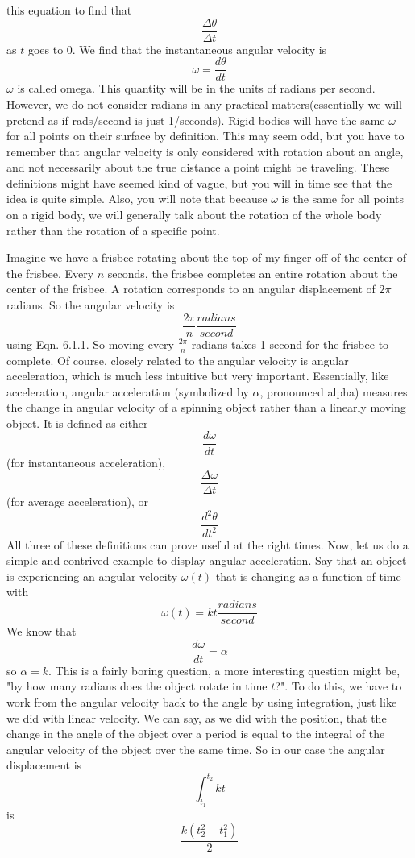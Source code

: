 \documentclass{article}[gray]
\numberwithin{equation}{subsection}
\begin{document}
this equation to find that $$\frac{\Delta \theta}{\Delta t}$$ as $t$ goes to 0. We find that the instantaneous angular velocity is \begin{equation}\omega=\frac{d\theta}{dt}\end{equation} $\omega$ is called omega. This quantity will be in the units of radians per second. However, we do not consider radians in any practical matters(essentially we will pretend as if rads/second is just 1/seconds). Rigid bodies will have the same $\omega$ for all points on their surface by definition. This may seem odd, but you have to remember that angular velocity is only considered with rotation about an angle, and not necessarily about the true distance a point might be traveling. These definitions might have seemed kind of vague, but you will in time see that the idea is quite simple. Also, you will note that because $\omega$ is the same for all points on a rigid body, we will generally talk about the rotation of the whole body rather than the rotation of a specific point. 

Imagine we have a frisbee rotating about the top of my finger off of the center of the frisbee. Every $n$ seconds, the frisbee completes an entire rotation about the center of the frisbee. A rotation corresponds to an angular displacement of $2\pi$ radians. So the angular velocity is $$\frac{2\pi}{n} \frac{radians}{second}$$ using Eqn. 6.1.1. So moving every $\frac{2\pi}{n}$ radians takes 1 second for the frisbee to complete. Of course, closely related to the angular velocity is angular acceleration, which is much less intuitive but very important. Essentially, like acceleration, angular acceleration (symbolized by $\alpha$, pronounced alpha)  measures the change in angular velocity of a spinning object rather than a linearly moving object. It is defined as either $$\frac{d\omega}{dt}$$(for instantaneous acceleration), $$\frac{\Delta \omega}{\Delta t}$$(for average acceleration), or $$\frac{d^2\theta}{dt^2}$$ All three of these definitions can prove useful at the right times. Now, let us do a simple and contrived example to display angular acceleration. Say that an object is experiencing an angular velocity $\omega \left(t\right)$ that is changing as a function of time with $$\omega \left(t\right)=kt \frac{radians}{second}$$ We know that \begin{equation}\frac{d \omega}{dt}=\alpha\end{equation} so $\alpha=k$. This is a fairly boring question, a more interesting question might be, "by how many radians does the object rotate in time $t$?". To do this, we have to work from the angular velocity back to the angle by using integration, just like we did with linear velocity. We can say, as we did with the position, that the change in the angle of the object over a period is equal to the integral of the angular velocity of the object over the same time. So in our case the angular displacement is $$\int_{t_1}^{t_2} kt$$ is $$\frac{k\left(t_{2}^2-t_{1}^2\right)}{2}$$
\end{document}
